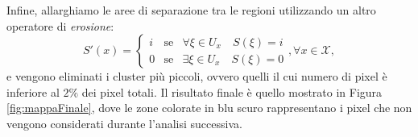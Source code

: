 Infine, allarghiamo le aree di separazione tra le regioni utilizzando un altro operatore di \textit{erosione}:
\[ S'(x) =  \left\{ \begin{array}{rcl}
i & \mbox{se} & \forall \xi \in U_x \quad S(\xi) = i \\
0 & \mbox{se} & \exists \xi \in U_x \quad S(\xi) = 0
\end{array}\right. , \forall x \in \mathcal{X},\]
e vengono eliminati i cluster pi\`u piccoli, ovvero quelli il cui numero di pixel \`e inferiore al $2\%$ dei pixel totali.   
Il risultato finale \`e quello mostrato in Figura \ref{fig:mappaFinale}, dove le zone colorate in blu scuro rappresentano i pixel che non vengono considerati durante l'analisi successiva.
